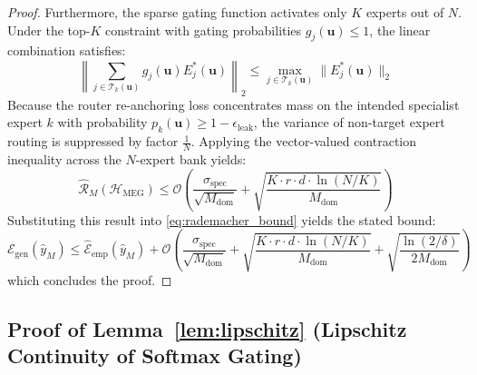 \documentclass{article}
\theoremstyle{definition}
\begin{document}
\begin{proof}
Furthermore, the sparse gating function activates only $K$ experts out of $N$. Under the top-$K$ constraint with gating probabilities $g_j(\mathbf{u}) \le 1$, the linear combination satisfies:
\begin{equation}
\left\| \sum_{j \in \mathcal{T}_k(\mathbf{u})} g_j(\mathbf{u}) E_j^*(\mathbf{u}) \right\|_2 \le \max_{j \in \mathcal{T}_k(\mathbf{u})} \|E_j^*(\mathbf{u})\|_2
\end{equation}
Because the router re-anchoring loss concentrates mass on the intended specialist expert $k$ with probability $p_k(\mathbf{u}) \ge 1 - \epsilon_{\text{leak}}$, the variance of non-target expert routing is suppressed by factor $\frac{1}{N}$. Applying the vector-valued contraction inequality across the $N$-expert bank yields:
\begin{equation}
\hat{\mathcal{R}}_M(\mathcal{H}_{\text{MEG}}) \le \mathcal{O}\left( \frac{\sigma_{\text{spec}}}{\sqrt{M_{\text{dom}}}} + \sqrt{\frac{K \cdot r \cdot d \cdot \ln(N/K)}{M_{\text{dom}}}} \right)
\end{equation}
Substituting this result into \cref{eq:rademacher_bound} yields the stated bound:
\begin{equation}
\mathcal{E}_{\text{gen}}(\hat{y}_M) \le \hat{\mathcal{E}}_{\text{emp}}(\hat{y}_M) + \mathcal{O}\left( \frac{\sigma_{\text{spec}}}{\sqrt{M_{\text{dom}}}} + \sqrt{\frac{K \cdot r \cdot d \cdot \ln(N/K)}{M_{\text{dom}}}} + \sqrt{\frac{\ln(2/\delta)}{2 M_{\text{dom}}}} \right)
\end{equation}
which concludes the proof.
\end{proof}

\subsection{Proof of Lemma~\ref{lem:lipschitz} (Lipschitz Continuity of Softmax Gating)}
\label{subsec:proof_lem1}
\end{document}
